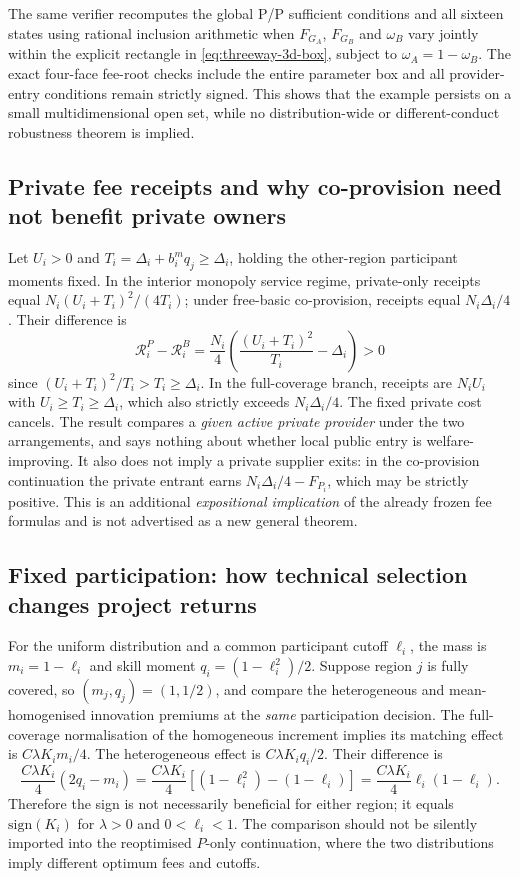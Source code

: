 \documentclass[11pt]{article}
\begin{document}
The same verifier recomputes the global P/P sufficient conditions and all sixteen states using rational inclusion arithmetic when $F_{G_A}$, $F_{G_B}$ and $\omega_B$ vary jointly within the explicit rectangle in \eqref{eq:threeway-3d-box}, subject to $\omega_A=1-\omega_B$. The exact four-face fee-root checks include the entire parameter box and all provider-entry conditions remain strictly signed. This shows that the example persists on a small multidimensional open set, while no distribution-wide or different-conduct robustness theorem is implied.

\subsection{Private fee receipts and why co-provision need not benefit private owners}
Let $U_i>0$ and $T_i=\Delta_i+b_i^m q_j\geq\Delta_i$, holding the other-region participant moments fixed. In the interior monopoly service regime, private-only receipts equal
$N_i(U_i+T_i)^2/(4T_i)$; under free-basic co-provision, receipts equal $N_i\Delta_i/4$. Their difference is
\begin{equation}
 \mathcal R_i^P-\mathcal R_i^B
 =\frac{N_i}{4}\left(\frac{(U_i+T_i)^2}{T_i}-\Delta_i\right)
 >0
\end{equation}
since $(U_i+T_i)^2/T_i>T_i\geq\Delta_i$. In the full-coverage branch, receipts are $N_iU_i$ with $U_i\geq T_i\geq\Delta_i$, which also strictly exceeds $N_i\Delta_i/4$. The fixed private cost cancels. The result compares a \emph{given active private provider} under the two arrangements, and says nothing about whether local public entry is welfare-improving. It also does not imply a private supplier exits: in the co-provision continuation the private entrant earns $N_i\Delta_i/4-F_{P_i}$, which may be strictly positive. This is an additional \emph{expositional implication} of the already frozen fee formulas and is not advertised as a new general theorem.

\subsection{Fixed participation: how technical selection changes project returns}
For the uniform distribution and a common participant cutoff $\ell_i$, the mass is
$m_i=1-\ell_i$ and skill moment $q_i=(1-\ell_i^2)/2$. Suppose region $j$ is fully covered, so $(m_j,q_j)=(1,1/2)$, and compare the heterogeneous and mean-homogenised innovation premiums at the \emph{same} participation decision. The full-coverage normalisation of the homogeneous increment implies its matching effect is $C\lambda K_i m_i/4$. The heterogeneous effect is $C\lambda K_iq_i/2$. Their difference is
\begin{equation}
 \frac{C\lambda K_i}{4}(2q_i-m_i)
 =\frac{C\lambda K_i}{4}\left[(1-\ell_i^2)-(1-\ell_i)\right]
 =\frac{C\lambda K_i}{4}\ell_i(1-\ell_i).
\end{equation}
Therefore the sign is not necessarily beneficial for either region; it equals $\mathrm{sign}(K_i)$ for $\lambda>0$ and $0<\ell_i<1$. The comparison should not be silently imported into the reoptimised $P$-only continuation, where the two distributions imply different optimum fees and cutoffs.
\end{document}
